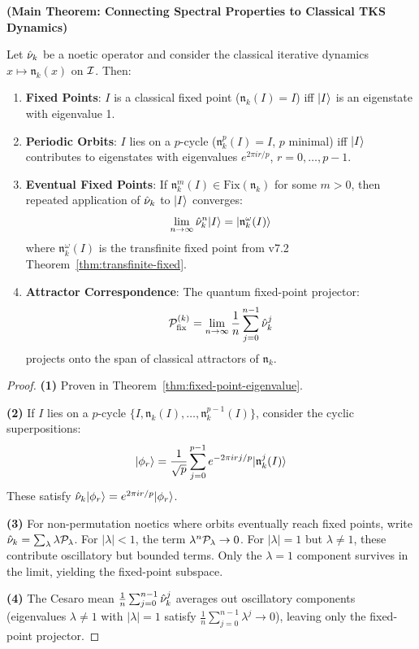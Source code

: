 \begin{theorem}
\label{thm:spectral-dynamic}
\textbf{(Main Theorem: Connecting Spectral Properties to Classical TKS Dynamics)}

Let $\hat{\nu}_k$ be a noetic operator and consider the classical iterative dynamics $x \mapsto \mathfrak{n}_k(x)$ on $\mathcal{I}$. Then:
\begin{enumerate}
  \item \textbf{Fixed Points}: $I$ is a classical fixed point ($\mathfrak{n}_k(I) = I$) iff $|I\rangle$ is an eigenstate with eigenvalue 1.

  \item \textbf{Periodic Orbits}: $I$ lies on a $p$-cycle ($\mathfrak{n}_k^p(I) = I$, $p$ minimal) iff $|I\rangle$ contributes to eigenstates with eigenvalues $e^{2\pi i r / p}$, $r = 0, \ldots, p-1$.

  \item \textbf{Eventual Fixed Points}: If $\mathfrak{n}_k^m(I) \in \mathrm{Fix}(\mathfrak{n}_k)$ for some $m > 0$, then repeated application of $\hat{\nu}_k$ to $|I\rangle$ converges:
  \[
  \lim_{n \to \infty} \hat{\nu}_k^n |I\rangle = |\mathfrak{n}_k^\omega(I)\rangle
  \]
  where $\mathfrak{n}_k^\omega(I)$ is the transfinite fixed point from v7.2 Theorem~\ref{thm:transfinite-fixed}.

  \item \textbf{Attractor Correspondence}: The quantum fixed-point projector:
  \[
  \mathcal{P}_{\mathrm{fix}}^{(k)} = \lim_{n \to \infty} \frac{1}{n} \sum_{j=0}^{n-1} \hat{\nu}_k^j
  \]
  projects onto the span of classical attractors of $\mathfrak{n}_k$.
\end{enumerate}
\end{theorem}

\begin{proof}
\textbf{(1)} Proven in Theorem~\ref{thm:fixed-point-eigenvalue}.

\textbf{(2)} If $I$ lies on a $p$-cycle $\{I, \mathfrak{n}_k(I), \ldots, \mathfrak{n}_k^{p-1}(I)\}$, consider the cyclic superpositions:
\[
|\phi_r\rangle = \frac{1}{\sqrt{p}} \sum_{j=0}^{p-1} e^{-2\pi i r j / p} |\mathfrak{n}_k^j(I)\rangle
\]
These satisfy $\hat{\nu}_k |\phi_r\rangle = e^{2\pi i r / p} |\phi_r\rangle$.

\textbf{(3)} For non-permutation noetics where orbits eventually reach fixed points, write $\hat{\nu}_k = \sum_\lambda \lambda \mathcal{P}_\lambda$. For $|\lambda| < 1$, the term $\lambda^n \mathcal{P}_\lambda \to 0$. For $|\lambda| = 1$ but $\lambda \neq 1$, these contribute oscillatory but bounded terms. Only the $\lambda = 1$ component survives in the limit, yielding the fixed-point subspace.

\textbf{(4)} The Cesaro mean $\frac{1}{n} \sum_{j=0}^{n-1} \hat{\nu}_k^j$ averages out oscillatory components (eigenvalues $\lambda \neq 1$ with $|\lambda| = 1$ satisfy $\frac{1}{n}\sum_{j=0}^{n-1} \lambda^j \to 0$), leaving only the fixed-point projector.
\end{proof}

